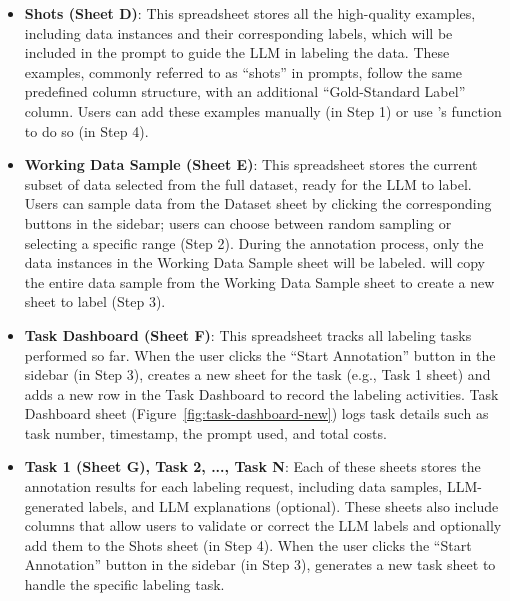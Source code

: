 \begin{itemize}
    
\item \textbf{Shots (Sheet D)}: 
This spreadsheet stores all the high-quality examples, including data instances and their corresponding labels, which will be included in the prompt to guide the LLM in labeling the data. 
These examples, commonly referred to as ``shots'' in prompts, follow the same predefined column structure, with an additional ``Gold-Standard Label'' column. 
Users can add these examples manually (in Step 1) or use \system's function to do so (in Step 4).


    
\item \textbf{Working Data Sample (Sheet E)}:
This spreadsheet stores the current subset of data selected from the full dataset, ready for the LLM to label.
Users can sample data from the Dataset sheet by clicking the corresponding buttons in the sidebar; users can choose between random sampling or selecting a specific range (Step 2). 
During the annotation process, only the data instances in the Working Data Sample sheet will be labeled. 
\system will copy the entire data sample from the Working Data Sample sheet to create a new sheet to label (Step 3).
    
    
\item \textbf{Task Dashboard (Sheet F)}:
This spreadsheet tracks all labeling tasks performed so far.
When the user clicks the ``Start Annotation'' button in the sidebar (in Step 3), \system creates a new sheet for the task (e.g., Task 1 sheet) and adds a new row in the Task Dashboard to record the labeling activities.
Task Dashboard sheet (Figure~\ref{fig:task-dashboard-new})
logs task details such as task number, timestamp, the prompt used, and total costs.

\item \textbf{Task 1 (Sheet G), Task 2, ..., Task N}:
Each of these sheets stores the annotation results for each labeling request, including data samples, LLM-generated labels, and LLM explanations (optional).
These sheets also include columns that allow users to validate or correct the LLM labels and optionally add them to the Shots sheet (in Step 4).
When the user clicks the ``Start Annotation'' button in the sidebar (in Step 3), \system generates a new task sheet to handle the specific labeling task.

    
    
\end{itemize}

